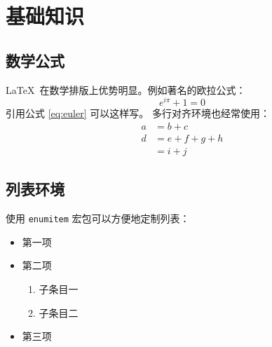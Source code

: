\chapter{基础知识}
\section{数学公式}
\LaTeX\ 在数学排版上优势明显\cite{knuth84}。例如著名的欧拉公式：
\begin{equation}\label{eq:euler}
  e^{i\pi} + 1 = 0
\end{equation}
引用公式 \eqref{eq:euler} 可以这样写。
多行对齐环境也经常使用：
\begin{align}
  a &= b + c \\
  d &= e + f + g + h \nonumber \\
    &= i + j
\end{align}

\section{列表环境}
使用 \texttt{enumitem} 宏包可以方便地定制列表：
\begin{itemize}[label=\textbullet, leftmargin=*]
  \item 第一项
  \item 第二项
  \begin{enumerate}[label=\alph*), nosep]
    \item 子条目一
    \item 子条目二
  \end{enumerate}
  \item 第三项
\end{itemize}